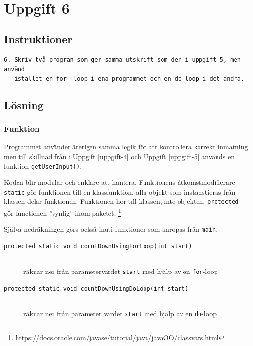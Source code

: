 \section{Uppgift 6}\label{uppgift-6}

\subsection{Instruktioner}
\begin{verbatim}
6. Skriv två program som ger samma utskrift som den i uppgift 5, men använd
   istället en for- loop i ena programmet och en do-loop i det andra.
\end{verbatim}

\subsection{Lösning}
\subsubsection{Funktion}
Programmet använder återigen samma logik för att kontrollera korrekt inmatning
men till skillnad från i Uppgift \ref{uppgift-4} och Uppgift \ref{uppgift-5}
används en funktion \texttt{getUserInput()}.
\par Koden blir modulär och enklare att hantera. Funktionens åtkomstmodifierare
\texttt{static} gör funktionen till en klassfunktion, alla objekt som
instanstieras från klassen delar funktionen. Funktionen hör till klassen, inte
objekten.
\texttt{protected} gör functionen ''synlig'' inom paketet.
\footnote{\url{https://docs.oracle.com/javase/tutorial/java/javaOO/classvars.html}}

\par Själva nedräkningen görs också inuti funktioner som anropas från
\texttt{main}.

\begin{description}
\item[\texttt{protected static void countDownUsingForLoop(int start)}] \hfill \\
räknar ner från parametervärdet \texttt{start} med hjälp av en \texttt{for}-loop

\item [\texttt{protected static void countDownUsingDoLoop(int start)}] \hfill \\
räknar ner från parameter värdet \texttt{start} med hjälp av en \texttt{do}-loop
\end{description}


